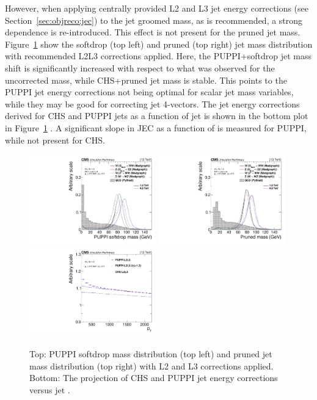 However, when applying centrally provided L2 and L3 jet energy corrections (see Section~\ref{sec:objreco:jec}) to the jet groomed mass, as is recommended, a strong \PT dependence is re-introduced. This effect is not present for the pruned jet mass. Figure~\ref{fig:searchII:wtagmass} show the softdrop (top left) and pruned (top right) jet mass distribution with recommended L2L3 corrections applied. Here, the PUPPI+softdrop jet mass shift is significantly increased with respect to what was observed for the uncorrected mass, while CHS+pruned jet mass is stable. This points to the PUPPI jet energy corrections not being optimal for scalar jet mass variables, while they may be good for correcting jet 4-vectors. The jet energy corrections derived for CHS and PUPPI jets as a function of jet \PT is shown in the bottom plot in Figure~\ref{fig:searchII:wtagmass} . A significant slope in JEC as a function of \PT is measured for PUPPI, while not present for CHS.

\begin{figure}[htb]
\centering
\includegraphics[width=0.49\textwidth]{figures/analysis/search2/AN-16-235/plots/gen_SoftdropMass.pdf}
\includegraphics[width=0.49\textwidth]{figures/analysis/search2/AN-16-235/plots/gen_PrunedMass.pdf}\\
\includegraphics[width=0.49\textwidth]{figures/analysis/search2/AN-16-235/plots/JECvsPT.pdf}
\caption{Top: PUPPI softdrop mass distribution (top left) and pruned jet mass distribution (top right) with L2 and L3 corrections applied. Bottom: The projection of CHS and PUPPI jet energy corrections versus jet \PT.}
\label{fig:searchII:wtagmass}
\end{figure}

